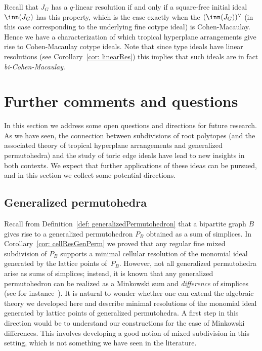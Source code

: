 Recall that $J_G$ has a $q$-linear resolution if and only if a square-free initial ideal $\inn(J_G)$ has this property, which is the case exactly when the $(\inn(J_G))^\vee$ (in this case corresponding to the underlying fine cotype ideal) is Cohen-Macaulay.  Hence we have a characterization of which tropical hyperplane arrangements give rise to Cohen-Macaulay cotype ideals.  Note that since type ideals have linear resolutions (see Corollary~\ref{cor: linearRes}) this implies that such ideals are in fact \emph{bi-Cohen-Macaulay}.

\section{Further comments and questions}\label{sec: GP}

In this section we address some open questions and directions for future research.  As we have seen, the connection between subdivisions of root polytopes (and the associated theory of tropical hyperplane arrangements and generalized permutohedra) and the study of toric edge ideals have lead to new insights in both contexts.  
We expect that further applications of these ideas can be pursued, and in this section we collect some potential directions.

\subsection{Generalized permutohedra}

Recall from Definition~\ref{def: generalizedPermutohedron} that a bipartite graph $B$ gives rise to a generalized permutohedron $P_B$ obtained as a sum of simplices. 
In Corollary~\ref{cor: cellResGenPerm} we proved that any regular fine mixed subdivision of $P_B$ supports a minimal cellular resolution of the monomial ideal generated by the lattice points of~$P_B$.  
However, not all generalized permutohedra arise as sums of simplices; instead, it is known that any generalized permutohedron can be realized as a Minkowski sum and \emph{difference} of simplices (see for instance~\cite{ArdBenDok}).  
It is natural to wonder whether one can extend the algebraic theory we developed here and describe minimal resolutions of the monomial ideal generated by lattice points of generalized permutohedra. A first step in this direction would be to understand our constructions for the case of Minkowski differences. This involves developing a good notion of mixed subdivision in this setting, which is not something we have seen in the literature.

